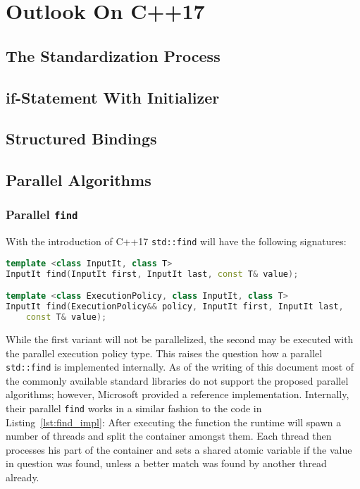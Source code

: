 \section{Outlook On C++17}

\subsection{The Standardization Process}

\subsection{if-Statement With Initializer}
\subsection{Structured Bindings}
\subsection{Parallel Algorithms}

\subsubsection{Parallel \texttt{find}}

With the introduction of C++17 \texttt{std::find} will have the following signatures:

\begin{lstlisting}[language=C++]
template <class InputIt, class T>
InputIt find(InputIt first, InputIt last, const T& value);

template <class ExecutionPolicy, class InputIt, class T>
InputIt find(ExecutionPolicy&& policy, InputIt first, InputIt last,
    const T& value);
\end{lstlisting}

While the first variant will not be parallelized, the second may be executed with the parallel execution policy type. This raises the question how a parallel \texttt{std::find} is implemented internally. As of the writing of this document most of the commonly available standard libraries do not support the proposed parallel algorithms; however, Microsoft provided a reference implementation. Internally, their parallel \texttt{find} works in a similar fashion to the code in Listing~\ref{lst:find_impl}: After executing the function the runtime will spawn a number of threads and split the container amongst them. Each thread then processes his part of the container and sets a shared atomic variable if the value in question was found, unless a better match was found by another thread already.

